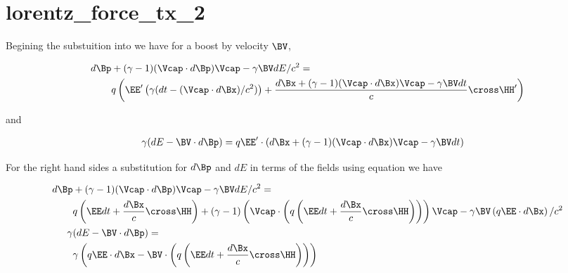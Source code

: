 %
%
%
%
%
%
%
%
\chapter{lorentz_force_tx_2}

Begining the substuition into  we have for a boost by velocity $\BV$, 

\begin{align*}
d\Bp &+ (\gamma-1)(\Vcap \cdot d\Bp) \Vcap - \gamma \BV dE/c^2 = \\
&q \left( \EE' \left(\gamma ( dt - (\Vcap \cdot d\Bx )/c^2 )\right) + \frac{d\Bx + (\gamma-1)(\Vcap \cdot d\Bx) \Vcap - \gamma \BV dt}{c} \cross \HH' \right)  \\
\end{align*}

and

\begin{align*}
\gamma ( dE - \BV \cdot d\Bp ) &= q \EE' \cdot \left(d\Bx + (\gamma-1)(\Vcap \cdot d\Bx) \Vcap - \gamma \BV dt\right)
\end{align*}

For the right hand sides a substitution for $d\Bp$ and $dE$ in terms of the fields using equation
 we have


\begin{align*}
d\Bp &+ (\gamma-1)(\Vcap \cdot d\Bp) \Vcap - \gamma \BV dE/c^2 = \\
&q \left( \EE dt + \frac{d\Bx}{c} \cross \HH \right) + (\gamma-1)\left(\Vcap \cdot \left(q \left( \EE dt + \frac{d\Bx}{c} \cross \HH \right)\right)\right) \Vcap - \gamma \BV \left( q \EE \cdot d\Bx \right)/c^2  \\
\gamma &( dE - \BV \cdot d\Bp ) = \\
&\gamma \left( q \EE \cdot d\Bx - \BV \cdot \left(q \left( \EE dt + \frac{d\Bx}{c} \cross \HH \right)\right) \right) 
\end{align*}

